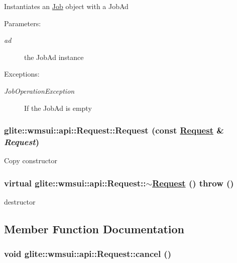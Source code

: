 Instantiates an \hyperlink{classglite_1_1wmsui_1_1api_1_1Job}{Job} object with a Job\-Ad \begin{Desc}
\item[Parameters:]
\begin{description}
\item[{\em ad}]the Job\-Ad instance \end{description}
\end{Desc}
\begin{Desc}
\item[Exceptions:]
\begin{description}
\item[{\em Job\-Operation\-Exception}]If the Job\-Ad is empty \end{description}
\end{Desc}
\hypertarget{classglite_1_1wmsui_1_1api_1_1Request_z9_4}{
\subsubsection[Request]{\setlength{\rightskip}{0pt plus 5cm}glite::wmsui::api::Request::Request (const \hyperlink{classglite_1_1wmsui_1_1api_1_1Request}{Request} \& {\em Request})}}
\label{classglite_1_1wmsui_1_1api_1_1Request_z9_4}


Copy constructor \hypertarget{classglite_1_1wmsui_1_1api_1_1Request_z9_5}{
\subsubsection[$\sim$Request]{\setlength{\rightskip}{0pt plus 5cm}virtual glite::wmsui::api::Request::$\sim$\hyperlink{classglite_1_1wmsui_1_1api_1_1Request}{Request} ()  throw ()}}
\label{classglite_1_1wmsui_1_1api_1_1Request_z9_5}


destructor 

\subsection{Member Function Documentation}
\hypertarget{classglite_1_1wmsui_1_1api_1_1Request_z13_4}{
\subsubsection[cancel]{\setlength{\rightskip}{0pt plus 5cm}void glite::wmsui::api::Request::cancel ()}}
\label{classglite_1_1wmsui_1_1api_1_1Request_z13_4}


